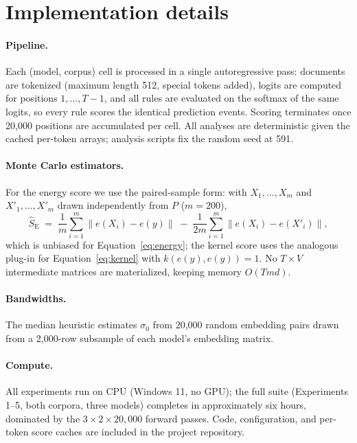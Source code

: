\documentclass{article}
\begin{document}
\section{Implementation details}
\label{app:impl}

\paragraph{Pipeline.} Each (model, corpus) cell is processed in a single autoregressive
pass: documents are tokenized (maximum length 512, special tokens added), logits are
computed for positions $1,\dots,T-1$, and all rules are evaluated on the softmax of the
same logits, so every rule scores the identical prediction events. Scoring terminates
once 20{,}000 positions are accumulated per cell. All analyses are deterministic given
the cached per-token arrays; analysis scripts fix the random seed at 591.

\paragraph{Monte Carlo estimators.} For the energy score we use the paired-sample form:
with $X_1,\dots,X_m$ and $X'_1,\dots,X'_m$ drawn independently from $P$ ($m=200$),
\[
  \widehat{S}_{\mathrm{E}} \;=\; \frac{1}{m}\sum_{i=1}^m \lVert e(X_i) - e(y)\rVert
  \;-\; \frac{1}{2m}\sum_{i=1}^m \lVert e(X_i) - e(X'_i)\rVert ,
\]
which is unbiased for Equation~\eqref{eq:energy}; the kernel score uses the analogous
plug-in for Equation~\eqref{eq:kernel} with $k(e(y),e(y)) = 1$. No $T \times V$
intermediate matrices are materialized, keeping memory $O(Tmd)$.

\paragraph{Bandwidths.} The median heuristic estimates $\sigma_0$ from 20{,}000 random
embedding pairs drawn from a 2{,}000-row subsample of each model's embedding matrix.

\paragraph{Compute.} All experiments run on CPU (Windows 11, no GPU); the full suite
(Experiments 1--5, both corpora, three models) completes in approximately six hours,
dominated by the $3 \times 2 \times 20{,}000$ forward passes. Code, configuration, and
per-token score caches are included in the project repository.
\end{document}
